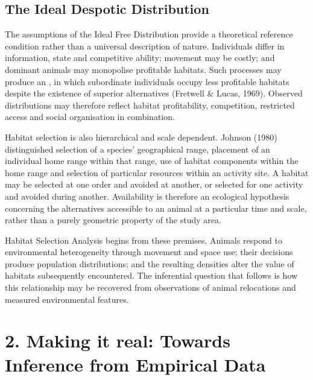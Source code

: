 \documentclass[letterpaper,10pt,english]{sphinxmanual}
\begin{document}
\subsection{The Ideal Despotic Distribution}
\label{\detokenize{theory:the-ideal-despotic-distribution}}
\sphinxAtStartPar
The assumptions of the Ideal Free Distribution provide a theoretical reference condition rather than a universal description of nature. Individuals differ in information, state and competitive ability; movement may be costly; and dominant animals may monopolise profitable habitats. Such processes may produce an , in which subordinate individuals occupy less profitable habitats despite the existence of superior alternatives (Fretwell \& Lucas, 1969). Observed distributions may therefore reflect habitat profitability, competition, restricted access and social organisation in combination.

\sphinxAtStartPar
Habitat selection is also hierarchical and scale dependent. Johnson (1980) distinguished selection of a species’ geographical range, placement of an individual home range within that range, use of habitat components within the home range and selection of particular resources within an activity site. A habitat may be selected at one order and avoided at another, or selected for one activity and avoided during another. Availability is therefore an ecological hypothesis concerning the alternatives accessible to an animal at a particular time and scale, rather than a purely geometric property of the study area.

\sphinxAtStartPar
Habitat Selection Analysis begins from these premises. Animals respond to environmental heterogeneity through movement and space use; their decisions produce population distributions; and the resulting densities alter the value of habitats subsequently encountered. The inferential question that follows is how this relationship may be recovered from observations of animal relocations and measured environmental features.


\section{2. Making it real: Towards Inference from Empirical Data}
\label{\detokenize{theory:making-it-real-towards-inference-from-empirical-data}}
\end{document}
